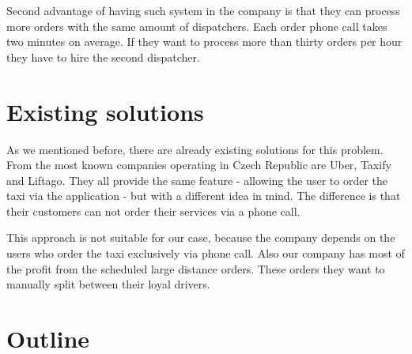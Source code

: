Second advantage of having such system in the company is that they can process more orders with the same amount of dispatchers. Each order phone call takes two minutes on average. If they want to process more than thirty orders per hour they have to hire the second dispatcher.


\section{Existing solutions}
As we mentioned before, there are already existing solutions for this problem. From the most known companies operating in Czech Republic are Uber, Taxify and Liftago. They all provide the same feature - allowing the user to order the taxi via the application - but with a different idea in mind. The difference is that their customers can not order their services via a phone call. 

This approach is not suitable for our case, because the company depends on the users who order the taxi exclusively via phone call. Also our company has most of the profit from the scheduled large distance orders. These orders they want to manually split between their loyal drivers. 


\section{Outline}

